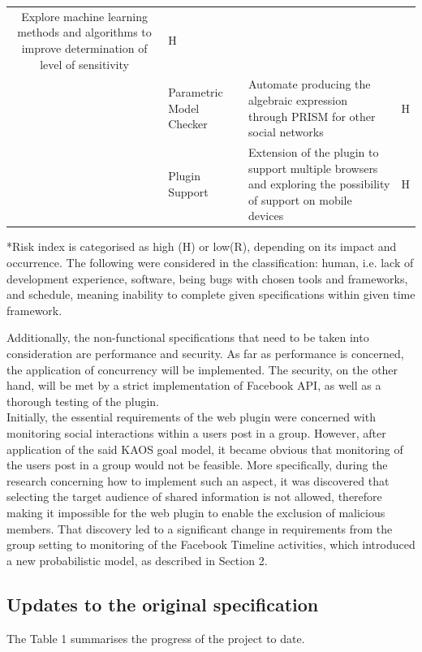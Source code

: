 \documentclass[a4paper,11pt]{article}
\begin{document}
\begin{table}[H]
\begin{tabular}{|c|M{4cm}|m{9.5cm}|c|}
Explore machine learning methods and algorithms to improve determination of level of sensitivity&H\\[2ex]
& Parametric Model Checker &
Automate  producing the algebraic expression through PRISM for other social networks&H\\[2ex]
& Plugin Support&
Extension of the plugin to support multiple browsers and exploring the possibility of support on mobile devices&H\\[2ex]
\hline
 \end{tabular}
*Risk index is categorised as high (H) or low(R), depending on its impact and occurrence. The following were considered in the classification: human, i.e. lack of development experience, software, being bugs with chosen tools and frameworks, and schedule, meaning inability to complete given specifications within given time framework.
 \end{table}
\indent Additionally, the non-functional specifications that need to be taken into consideration are performance and security. As far as performance is concerned, the application of concurrency will be implemented. The security, on the other hand, will be met by a strict implementation of Facebook API, as well as a thorough testing of the plugin. 
\\
\indent Initially, the essential requirements of the web plugin were concerned with monitoring social interactions within a user\textquotesingle s post in a group. However, after application of the said KAOS goal model, it became obvious that monitoring of the user\textquotesingle s post in a group would not be feasible. More specifically, during the research concerning how to implement such an aspect, it was discovered that selecting the target audience of shared information is not allowed, therefore making it impossible for the web plugin to enable the exclusion of malicious members. That discovery led to a significant change in requirements from the group setting to monitoring of the Facebook Timeline activities, which introduced a new probabilistic model, as described in Section 2.

\subsection{Updates to the original specification}

The Table 1 summarises the progress of the project to date.
\end{document}
